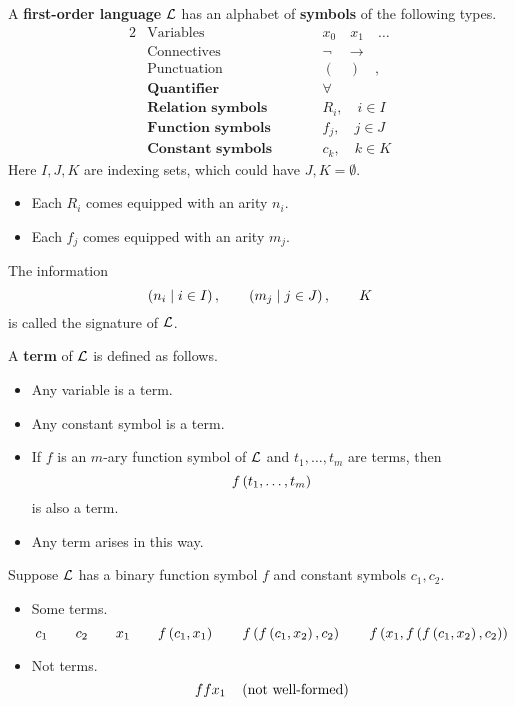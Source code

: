 \begin{definition}
\label{def:2.2.1}
A \textbf{first-order language} $ \mathcal{L} $ has an alphabet of \textbf{symbols} of the following types.
\begin{alignat*}{2}
& \text{Variables} & \qquad & x_0 \quad x_1 \quad \dots \\
& \text{Connectives} & \qquad & \neg \quad \rightarrow \\
& \text{Punctuation} & \qquad & ( \quad ) \quad , \\
& \textbf{Quantifier} & \qquad & \forall \\
& \textbf{Relation symbols} & \qquad & R_i, \quad i \in I \\
& \textbf{Function symbols} & \qquad & f_j, \quad j \in J \\
& \textbf{Constant symbols} & \qquad & c_k, \quad k \in K
\end{alignat*}
Here $ I, J, K $ are indexing sets, which could have $ J, K = \emptyset $.
\begin{itemize}
\item Each $ R_i $ comes equipped with an arity $ n_i $.
\item Each $ f_j $ comes equipped with an arity $ m_j $.
\end{itemize}
The information
$$ \left( n_i \mid i \in I \right), \qquad \left( m_j \mid j \in J \right), \qquad K $$
is called the signature of $ \mathcal{L} $.
\end{definition}

\pagebreak

\begin{definition}
A \textbf{term} of $ \mathcal{L} $ is defined as follows.
\begin{itemize}
\item Any variable is a term.
\item Any constant symbol is a term.
\item If $ f $ is an $ m $-ary function symbol of $ \mathcal{L} $ and $ t_1, \dots, t_m $ are terms, then
$$ f\left( t_1, \dots, t_m \right) $$
is also a term.
\item Any term arises in this way.
\end{itemize}
\end{definition}

\begin{example2}
Suppose $ \mathcal{L} $ has a binary function symbol $ f $ and constant symbols $ c_1, c_2 $.
\begin{itemize}
\item Some terms.
$$ c_1 \qquad c_2 \qquad x_1 \qquad f\left( c_1, x_1 \right) \qquad f\left( f\left( c_1, x_2 \right), c_2 \right) \qquad f\left( x_1, f\left( f\left( c_1, x_2 \right), c_2 \right) \right) $$
\item Not terms.
$$ ffx_1 \quad \left( \text{not well-formed} \right) $$
\end{itemize}
\end{example2}

